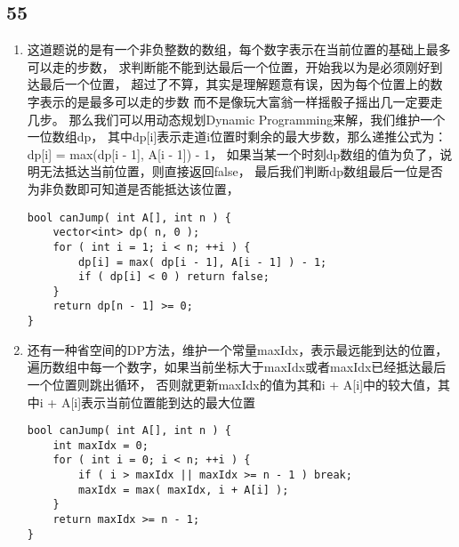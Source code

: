 \documentclass[12pt,a4paper]{article}
\begin{document}
\subsection{55}
\begin{enumerate}
\item
\begin{CJK}{UTF8}{gbsn}
这道题说的是有一个非负整数的数组，每个数字表示在当前位置的基础上最多可以走的步数，
求判断能不能到达最后一个位置，开始我以为是必须刚好到达最后一个位置，
超过了不算，其实是理解题意有误，因为每个位置上的数字表示的是最多可以走的步数
而不是像玩大富翁一样摇骰子摇出几一定要走几步。
那么我们可以用动态规划Dynamic Programming来解，我们维护一个一位数组dp，
其中dp[i]表示走道i位置时剩余的最大步数，那么递推公式为：dp[i] = max(dp[i - 1], A[i - 1]) - 1，
如果当某一个时刻dp数组的值为负了，说明无法抵达当前位置，则直接返回false，
最后我们判断dp数组最后一位是否为非负数即可知道是否能抵达该位置，
\end{CJK}
\begin{lstlisting}
bool canJump( int A[], int n ) {
	vector<int> dp( n, 0 );
	for ( int i = 1; i < n; ++i ) {
		dp[i] = max( dp[i - 1], A[i - 1] ) - 1;
		if ( dp[i] < 0 ) return false;
	}
	return dp[n - 1] >= 0;
}
\end{lstlisting}
\item
\begin{CJK}{UTF8}{gbsn}
还有一种省空间的DP方法，维护一个常量maxIdx，表示最远能到达的位置，
遍历数组中每一个数字，如果当前坐标大于maxIdx或者maxIdx已经抵达最后一个位置则跳出循环，
否则就更新maxIdx的值为其和i + A[i]中的较大值，其中i + A[i]表示当前位置能到达的最大位置
\end{CJK}
\begin{lstlisting}
bool canJump( int A[], int n ) {
	int maxIdx = 0;
	for ( int i = 0; i < n; ++i ) {
		if ( i > maxIdx || maxIdx >= n - 1 ) break;
		maxIdx = max( maxIdx, i + A[i] );
	}
	return maxIdx >= n - 1;
}
\end{lstlisting}
\end{enumerate}
\end{document}
